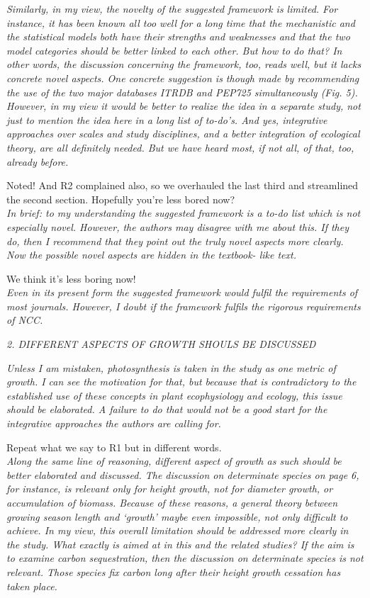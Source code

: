\documentclass[11pt]{article}
\begin{document}
\emph{Similarly, in my view, the novelty of the suggested framework is limited. For instance, it has been known all too well for a long time that the mechanistic and the statistical models both have their strengths and weaknesses and that the two model categories should be better linked to each other. But how to do that? In other words, the discussion concerning the framework, too, reads well, but it lacks concrete novel aspects. One concrete suggestion is though made by recommending the use of the two major databases ITRDB and PEP725 simultaneously (Fig. 5). However, in my view it would be better to realize the idea in a separate study, not just to mention the idea here in a long list of to-do’s. And yes, integrative approaches over scales and study disciplines, and a better integration of ecological theory, are all definitely needed. But we have heard most, if not all, of that, too, already before.}

Noted! And R2 complained also, so we overhauled the last third and streamlined the second section. Hopefully you're less bored now?\\

\emph{In brief: to my understanding the suggested framework is a to-do list which is not especially novel. However, the authors may disagree with me about this. If they do, then I recommend that they point out the truly novel aspects more clearly. Now the possible novel aspects are hidden in the textbook- like text.}

We think it's less boring now!\\

\emph{Even in its present form the suggested framework would fulfil the requirements of most journals. However, I doubt if the framework fulfils the rigorous requirements of NCC.}


\emph{2. DIFFERENT ASPECTS OF GROWTH SHOULS BE DISCUSSED}

\emph{Unless I am mistaken, photosynthesis is taken in the study as one metric of growth. I can see the motivation for that, but because that is contradictory to the established use of these concepts in plant ecophysiology and ecology, this issue should be elaborated. A failure to do that would not be a good start for the integrative approaches the authors are calling for.}

Repeat what we say to R1 but in different words.\\

\emph{Along the same line of reasoning, different aspect of growth as such should be better elaborated and discussed. The discussion on determinate species on page 6, for instance, is relevant only for height growth, not for diameter growth, or accumulation of biomass. Because of these reasons, a general theory between growing season length and ‘growth’ maybe even impossible, not only difficult to achieve. In my view, this overall limitation should be addressed more clearly in the study. What exactly is aimed at in this and the related studies? If the aim is to examine carbon sequestration, then the discussion on determinate species is not relevant. Those species fix carbon long after their height growth cessation has taken place.}
\end{document}

